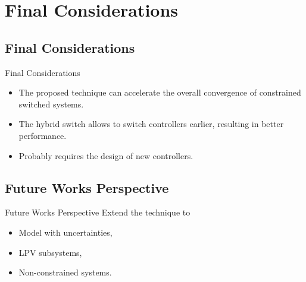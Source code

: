 
\section{Final Considerations}%
\label{sec:conclusion}

\subsection{Final Considerations}%
\label{subsec:conclusion}

\begin{slide}{Final Considerations}
  \begin{itemize}
    \item The proposed technique can accelerate the overall convergence of
          constrained switched systems.
    \item The hybrid switch allows to switch controllers earlier, resulting in
          better performance.
    \item Probably requires the design of new controllers.
  \end{itemize}
\end{slide}

\subsection{Future Works Perspective}%
\label{subsec:future-works}

\begin{slide}{Future Works Perspective}
  Extend the technique to
  \begin{itemize}
    \item Model with uncertainties,
    \item LPV subsystems,
    \item Non-constrained systems.
  \end{itemize}
\end{slide}
